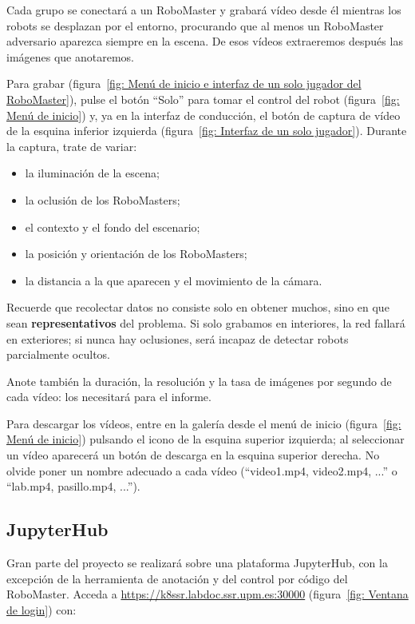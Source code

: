 \documentclass[12pt,a4paper]{article}
\begin{document}
Cada grupo se conectará a un RoboMaster y grabará vídeo desde él mientras los robots se desplazan por el entorno, procurando que al menos un RoboMaster adversario aparezca siempre en la escena. De esos vídeos extraeremos después las imágenes que anotaremos.

Para grabar (figura~\ref{fig: Menú de inicio e interfaz de un solo jugador del RoboMaster}), pulse el botón ``Solo'' para tomar el control del robot (figura~\ref{fig: Menú de inicio}) y, ya en la interfaz de conducción, el botón de captura de vídeo de la esquina inferior izquierda (figura~\ref{fig: Interfaz de un solo jugador}). Durante la captura, trate de variar:

\begin{itemize}
    \item la iluminación de la escena;
    \item la oclusión de los RoboMasters;
    \item el contexto y el fondo del escenario;
    \item la posición y orientación de los RoboMasters;
    \item la distancia a la que aparecen y el movimiento de la cámara.
\end{itemize}

Recuerde que recolectar datos no consiste solo en obtener muchos, sino en que sean \textbf{representativos} del problema. Si solo grabamos en interiores, la red fallará en exteriores; si nunca hay oclusiones, será incapaz de detectar robots parcialmente ocultos.

Anote también la duración, la resolución y la tasa de imágenes por segundo de cada vídeo: los necesitará para el informe.

Para descargar los vídeos, entre en la galería desde el menú de inicio (figura~\ref{fig: Menú de inicio}) pulsando el icono de la esquina superior izquierda; al seleccionar un vídeo aparecerá un botón de descarga en la esquina superior derecha. No olvide poner un nombre adecuado a cada vídeo (``video1.mp4, video2.mp4, ...'' o ``lab.mp4, pasillo.mp4, ...'').

\subsection{JupyterHub}

Gran parte del proyecto se realizará sobre una plataforma JupyterHub, con la excepción de la herramienta de anotación y del control por código del RoboMaster. Acceda a \url{https://k8ssr.labdoc.ssr.upm.es:30000} (figura~\ref{fig: Ventana de login}) con:
\end{document}
